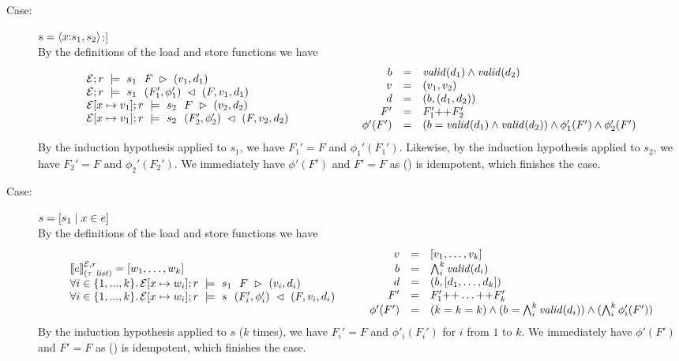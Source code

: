 {\begin{description}
\item[Case:]$s = \SPair{x}{s_1}{s_2}$:]\\[1ex]
%
By the definitions of the load and store functions we have 
\[ 
\begin{array}{l}
\load{\Env}{F}{r}{s_1}{v_1,d_1}\\
\store{\Env}{F}{r}{v_1,d_1}{s_1}{F_1',\phi_1'}\\
\load{\Env[x \mapsto v_1]}{F}{r}{s_2}{v_2,d_2}\\
\store{\Env[x \mapsto v_1]}{F}{r}{v_2,d_2}{s_2}{F_2',\phi_2'}\\
\end{array} \hspace*{2cm}
\begin{array}{rcl}
b &= & \valid{d_1} \wedge \valid{d_2}\\
v &=& (v_1,v_2)\\
d &=& (b,(d_1,d_2))\\
F' &=& F_1' \FAppend F_2'\\
\phi'(F') &=& (b = \valid{d_1} \wedge \valid{d_2}) \wedge \phi_1'(F') \wedge \phi_2'(F')\\
\end{array}
\]
By the induction hypothesis applied to $s_1$, we have $F_1' = F$ and
$\phi_1'(F_1')$. Likewise, by the induction hypothesis applied to
$s_2$, we have $F_2' = F$ and $\phi_2'(F_2')$. We immediately have
$\phi'(F')$ and $F' = F$ as (\FAppend) is idempotent, which finishes
the case.

\item[Case:] $s = \SComp{s_1}{x}{e}$\\[1ex]
%
By the definitions of the load and store functions we have 
\[ 
\begin{array}{l}
\eval{e}{\Env,r}{(\tau\ \mathit{list})} = [w_1,\dots,w_k ]\\
\forall i \in \{1,...,k\}.\,\load{\Env[ x \mapsto w_i]}{F}{r}{s_1}{v_i,d_i}\\
\forall i \in \{1,...,k\}.\,\store{\Env[x \mapsto w_i]}{F}{r}{v_i,d_i}{s}{F_i',\phi_i'}\\
\end{array}\hspace*{.75cm}\begin{array}{rcl}
v &=& [v_1,\dots,v_k]\\
b &= &\bigwedge_i^k \valid{d_i}\\
d &=& (b,[d_1,\dots,d_k])\\
F' &=& F_1' \FAppend \dots \FAppend F_k'\\
\phi'(F') &=& (k = k = k) \wedge (b = \bigwedge_i^k \valid{d_i}) \wedge (\bigwedge_i^k \phi_i'(F'))\\
\end{array}
\]
By the induction hypothesis applied to $s$ ($k$ times), we have $F_i'
= F$ and $\phi'_i(F_i')$ for $i$ from $1$ to $k$. We immediately have
$\phi'(F')$ and $F' = F$ as (\FAppend) is idempotent, which finishes
the case.


\end{description}}
